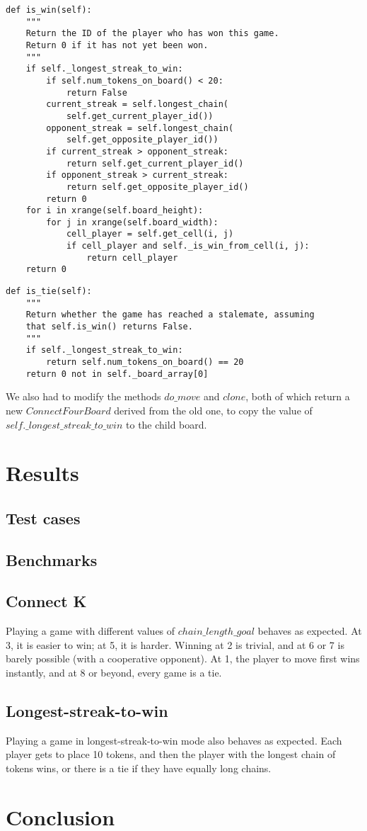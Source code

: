 \documentclass[11pt]{article}
\begin{document}
\lstset{language=Python}
\begin{lstlisting}[frame=single]
def is_win(self):
	"""
	Return the ID of the player who has won this game.
	Return 0 if it has not yet been won.
	"""
	if self._longest_streak_to_win:
		if self.num_tokens_on_board() < 20:
			return False
		current_streak = self.longest_chain(
			self.get_current_player_id())
		opponent_streak = self.longest_chain(
			self.get_opposite_player_id())
		if current_streak > opponent_streak:
			return self.get_current_player_id()
		if opponent_streak > current_streak:
			return self.get_opposite_player_id()
		return 0
	for i in xrange(self.board_height):
		for j in xrange(self.board_width):
			cell_player = self.get_cell(i, j)
			if cell_player and self._is_win_from_cell(i, j):
				return cell_player
	return 0
\end{lstlisting}

\lstset{language=Python}
\begin{lstlisting}[frame=single]
def is_tie(self):
	"""
	Return whether the game has reached a stalemate, assuming
	that self.is_win() returns False.
	"""
	if self._longest_streak_to_win:
		return self.num_tokens_on_board() == 20
	return 0 not in self._board_array[0]
\end{lstlisting}

We also had to modify the methods \(do\_move\) and \(clone\), both of which
return a new \(ConnectFourBoard\) derived from the old one, to copy the value
of \(self.\_longest\_streak\_to\_win\) to the child board.

\section{Results}

\subsection{Test cases}

\subsection{Benchmarks}

\subsection{Connect K}

Playing a game with different values of \(chain\_length\_goal\) behaves as
expected. At 3, it is easier to win; at 5, it is harder. Winning at 2 is
trivial, and at 6 or 7 is barely possible (with a cooperative opponent).
At 1, the player to move first wins instantly, and at 8 or beyond, every game
is a tie.

\subsection{Longest-streak-to-win}

Playing a game in longest-streak-to-win mode also behaves as expected. Each
player gets to place 10 tokens, and then the player with the longest chain
of tokens wins, or there is a tie if they have equally long chains.

\section{Conclusion}
\end{document}
